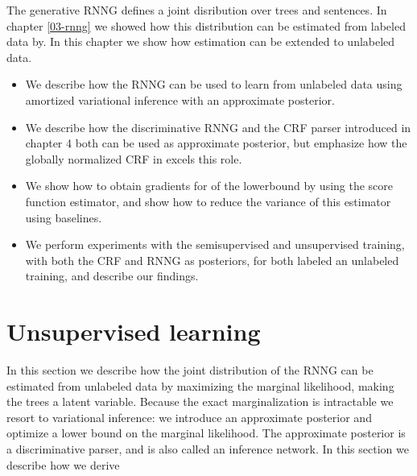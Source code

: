 The generative RNNG defines a joint disribution over trees and sentences. In chapter \ref{03-rnng} we showed how this distribution can be estimated from labeled data by. In this chapter we show how estimation can be extended to unlabeled data.
\begin{itemize}
  \item We describe how the RNNG can be used to learn from unlabeled data using amortized variational inference with an approximate posterior.
  \item We describe how the discriminative RNNG and the CRF parser introduced in chapter 4 both can be used as approximate posterior, but emphasize how the globally normalized CRF in excels this role.
  \item We show how to obtain gradients for of the lowerbound by using the score function estimator, and show how to reduce the variance of this estimator using baselines.
  \item We perform experiments with the semisupervised and unsupervised training, with both the CRF and RNNG as posteriors, for both labeled an unlabeled training, and describe our findings.
\end{itemize}


\section{Unsupervised learning}
  In this section we describe how the joint distribution of the RNNG can be estimated from unlabeled data by maximizing the marginal likelihood, making the trees a latent variable. Because the exact marginalization is intractable we resort to variational inference: we introduce an approximate posterior and optimize a lower  bound on the marginal likelihood. The approximate posterior is a discriminative parser, and is also called an inference network. In this section we describe how we derive

